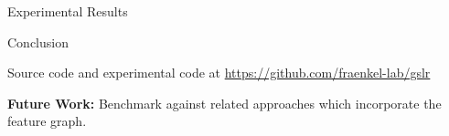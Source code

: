 \documentclass[svgnames,final]{beamer}
\begin{document}
\begin{frame}
\begin{columns}[T]
\begin{column}{.3\linewidth}
\begin{block}{Experimental Results}
	\end{block}

	\vspace{1.0cm}

	\begin{block}{Conclusion}

		Source code and experimental code at \href{https://github.com/fraenkel-lab/gslr}{https://github.com/fraenkel-lab/gslr}

		\vspace{1.0cm}

		\textbf{Future Work:} Benchmark against related approaches which incorporate the feature graph.

	\end{block}

\end{column}
\end{columns}
\end{frame}
\end{document}
